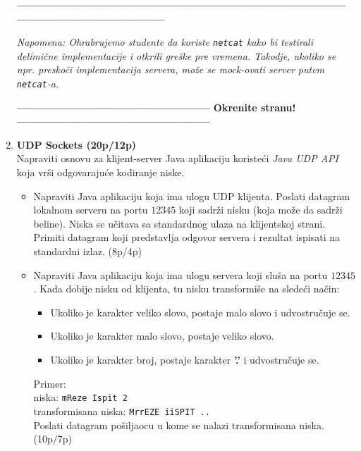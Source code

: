 \documentclass[]{article}
\begin{document}
\begin{enumerate}
\vspace{15pt}
\begin{center}
  \textbf{------------------------------------------------------------------------------------------------------------------------------}
\end{center}
\textit{Napomena: Ohrabrujemo studente da koriste \texttt{netcat} kako bi testirali delimi\v{c}ne implementacije i otkrili gre\v{s}ke pre vremena. Takodje, ukoliko se npr. presko\v{c}i implementacija servera, mo\v{z}e se mock-ovati server putem \texttt{netcat}-a.} 
\begin{center}
  \textbf{--------------------------------------------------- Okrenite stranu! ---------------------------------------------------}
\end{center}

\newpage

\item \textbf{UDP Sockets (20p/12p)}
\\Napraviti osnovu za klijent-server Java aplikaciju koriste\'c{}i \emph{Java UDP API} koja vr\v{s}i odgovaraju\'c{}e kodiranje niske. 

\begin{itemize}
  \item Napraviti Java aplikaciju koja ima ulogu UDP klijenta. Poslati datagram lokalnom serveru na portu $12345$ koji sadr\v{z}i nisku (koja može da sadrži beline). Niska se učitava sa standardnog ulaza na klijentskoj strani. Primiti datagram koji predstavlja odgovor servera i rezultat ispisati na standardni izlaz. \hfill(8p/4p)
  \item Napraviti Java aplikaciju koja ima ulogu servera koji sluša na portu $12345$. Kada dobije nisku od klijenta, tu nisku transformiše na sledeći način:
  \begin{itemize}
  	\item Ukoliko je karakter veliko slovo, postaje malo slovo i udvostručuje se.
  	\item Ukoliko je karakter malo slovo, postaje veliko slovo.
  	\item Ukoliko je karakter broj, postaje karakter \textbf{'.'} i udvostručuje se.
  \end{itemize} 

  Primer:\\
  niska:  \texttt{mReze Ispit 2}\\
  transformisana niska: \texttt{MrrEZE iiSPIT ..}\\ 
  Poslati datagram po\v{s}iljaocu u kome se nalazi transformisana niska. \hfill(10p/7p)


\end{itemize}
\end{enumerate}
\end{document}

